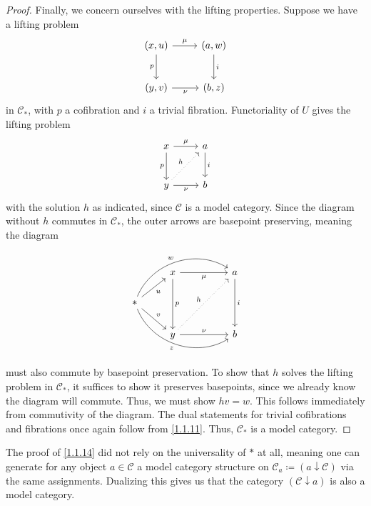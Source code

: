 \begin{proof}
	Finally, we concern ourselves with the lifting properties. Suppose we have a lifting problem
	\[\begin{tikzcd}[row sep = 2.5em, column sep = 2.5em]
		(x,u)\ar[" p "', d] \ar[" \mu ", r]  & (a,w)\ar[" i ", d]  \\
		(y,v)\ar[" \nu "', r]  & (b,z)
	\end{tikzcd}\]
	in $\mathcal{C} _*$, with $p$ a cofibration and $i$ a trivial fibration. Functoriality of $U$ gives the lifting problem
	\[\begin{tikzcd}[row sep = 2.5em, column sep = 2.5em]
	x\ar[" \mu ", r] \ar[" p "', d]  & a \ar[" i ", d]  \\
	y \ar[" \nu  "', r] \ar[" h ", dotted, ur]  & b
	\end{tikzcd}\]
	with the solution $h$ as indicated, since $\mathcal{C} $ is a model category. Since the diagram without $h$ commutes in $\mathcal{C} _*$, the outer arrows are basepoint preserving, meaning the diagram
	\[\begin{tikzcd}
	& x && a \\
	{*} \\
	& y && b
	\arrow["\mu"', from=1-2, to=1-4]
	\arrow["p", from=1-2, to=3-2]
	\arrow["i", from=1-4, to=3-4]
	\arrow["u"', from=2-1, to=1-2]
	\arrow["w", bend left=50, from=2-1, to=1-4]
	\arrow["v", from=2-1, to=3-2]
	\arrow["z"', bend right=50, from=2-1, to=3-4]
	\arrow["h", dotted, from=3-2, to=1-4]
	\arrow["\nu", from=3-2, to=3-4]
\end{tikzcd}\]
must also commute by basepoint preservation. To show that $h$ solves the lifting problem in $\mathcal{C} _*$, it suffices to show it preserves basepoints, since we already know the diagram will commute. Thus, we must show $hv=w$. This follows immediately from commutivity of the diagram. The dual statements for trivial cofibrations and fibrations once again follow from \cref{1.1.11}. Thus, $\mathcal{C} _*$ is a model category.
\end{proof}

\begin{remark}\label{1.1.15}
	The proof of \cref{1.1.14} did not rely on the universality of $*$ at all, meaning one can generate for any object $a\in \mathcal{C} $ a model category structure on $\mathcal{C} _a \coloneqq (a\downarrow \mathcal{C} )$ via the same assignments. Dualizing this gives us that the category $(\mathcal{C} \downarrow a)$ is also a model category.
\end{remark}


